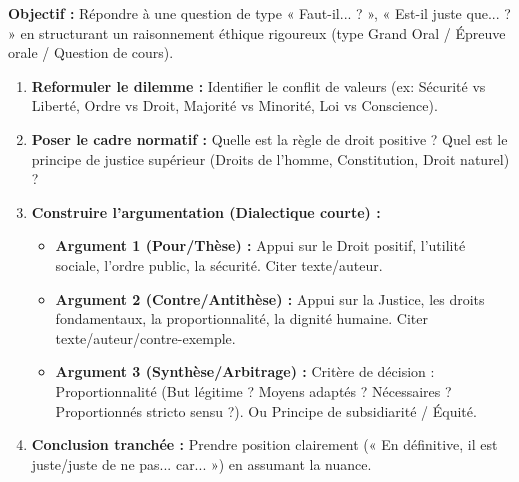 \documentclass[11pt]{article}
\newcommand{\cle}[1]{{\popxbold\color{popdark}#1}}
\begin{document}
\begin{methode}
    \textbf{Objectif :} Répondre à une question de type « Faut-il... ? », « Est-il juste que... ? » en structurant un raisonnement éthique rigoureux (type Grand Oral / Épreuve orale / Question de cours).
    \begin{enumerate}
        \item \textbf{Reformuler le dilemme :} Identifier le conflit de valeurs (ex: Sécurité vs Liberté, Ordre vs Droit, Majorité vs Minorité, Loi vs Conscience).
        \item \textbf{Poser le cadre normatif :} Quelle est la règle de droit positive ? Quel est le principe de justice supérieur (Droits de l'homme, Constitution, Droit naturel) ?
        \item \textbf{Construire l'argumentation (Dialectique courte) :}
            \begin{itemize}
                \item \textbf{Argument 1 (Pour/Thèse) :} Appui sur le Droit positif, l'utilité sociale, l'ordre public, la sécurité. Citer texte/auteur.
                \item \textbf{Argument 2 (Contre/Antithèse) :} Appui sur la Justice, les droits fondamentaux, la proportionnalité, la dignité humaine. Citer texte/auteur/contre-exemple.
                \item \textbf{Argument 3 (Synthèse/Arbitrage) :} Critère de décision : \cle{Proportionnalité} (But légitime ? Moyens adaptés ? Nécessaires ? Proportionnés stricto sensu ?). Ou \cle{Principe de subsidiarité} / \cle{Équité}.
            \end{itemize}
        \item \textbf{Conclusion tranchée :} Prendre position clairement (« En définitive, il est juste/juste de ne pas... car... ») en assumant la nuance.
    \end{enumerate}
\end{methode}
\end{document}
